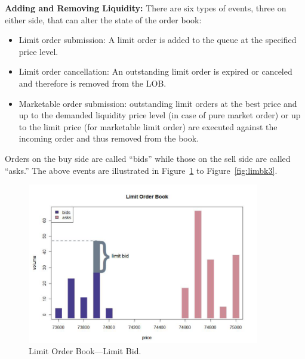 \noindent\textbf{Adding and Removing Liquidity:} There are six types of events, three on either side, that can alter the state of the order book:
	\begin{itemize}
	\item Limit order submission: A limit order is added to the queue at the specified price level.
	\item Limit order cancellation: An outstanding limit order is expired or canceled and therefore is removed from the LOB.
	\item Marketable order submission: outstanding limit orders at the best price and up to the demanded liquidity price level (in case of pure market order) or up to the limit price (for marketable limit order) are executed against the incoming order and thus removed from the book.
	\end{itemize}


Orders on the buy side are called ``bids'' while those on the sell side are called ``asks.'' The above events are illustrated in Figure~\ref{fig:limbk1} to Figure~\ref{fig:limbk3}. \\
	\begin{figure}[!ht]
	   \centering
	   \includegraphics[width=0.9\textwidth]{chapters/chapter_trading_fund/figures/limitbk1.png} 
	   \caption{Limit Order Book---Limit Bid. \label{fig:limbk1}}
	\end{figure}
	
